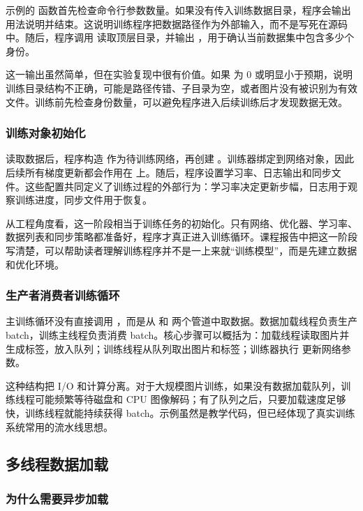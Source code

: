 示例的  函数首先检查命令行参数数量。如果没有传入训练数据目录，程序会输出用法说明并结束。这说明训练程序把数据路径作为外部输入，而不是写死在源码中。随后，程序调用  读取顶层目录，并输出 ，用于确认当前数据集中包含多少个身份。

这一输出虽然简单，但在实验复现中很有价值。如果  为 0 或明显小于预期，说明训练目录结构不正确，可能是路径传错、子目录为空，或者图片没有被识别为有效文件。训练前先检查身份数量，可以避免程序进入后续训练后才发现数据无效。

\subsubsection{训练对象初始化}

读取数据后，程序构造  作为待训练网络，再创建 。训练器绑定到网络对象，因此后续所有梯度更新都会作用在  上。随后，程序设置学习率、日志输出和同步文件。这些配置共同定义了训练过程的外部行为：学习率决定更新步幅，日志用于观察训练进度，同步文件用于恢复。

从工程角度看，这一阶段相当于训练任务的初始化。只有网络、优化器、学习率、数据列表和同步策略都准备好，程序才真正进入训练循环。课程报告中把这一阶段写清楚，可以帮助读者理解训练程序并不是一上来就“训练模型”，而是先建立数据和优化环境。

\subsubsection{生产者消费者训练循环}

主训练循环没有直接调用 ，而是从  和  两个管道中取数据。数据加载线程负责生产 batch，训练主线程负责消费 batch。核心步骤可以概括为：加载线程读取图片并生成标签，放入队列；训练线程从队列取出图片和标签；训练器执行  更新网络参数。

这种结构把 I/O 和计算分离。对于大规模图片训练，如果没有数据加载队列，训练线程可能频繁等待磁盘和 CPU 图像解码；有了队列之后，只要加载速度足够快，训练线程就能持续获得 batch。示例虽然是教学代码，但已经体现了真实训练系统常用的流水线思想。

\subsection{多线程数据加载}

\subsubsection{为什么需要异步加载}

